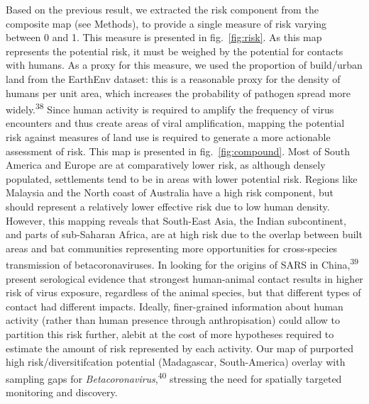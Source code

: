\documentclass[10pt,oneside]{article}
\begin{document}
Based on the previous result, we extracted the risk component from the
composite map (see Methods), to provide a single measure of risk varying
between 0 and 1. This measure is presented in fig.~\ref{fig:risk}. As
this map represents the potential risk, it must be weighed by the
potential for contacts with humans. As a proxy for this measure, we used
the proportion of build/urban land from the EarthEnv dataset: this is a
reasonable proxy for the density of humans per unit area, which
increases the probability of pathogen spread more
widely.\textsuperscript{38} Since human activity is required to amplify
the frequency of virus encounters and thus create areas of viral
amplification, mapping the potential risk against measures of land use
is required to generate a more actionable assessment of risk. This map
is presented in fig.~\ref{fig:compound}. Most of South America and
Europe are at comparatively lower risk, as although densely populated,
settlements tend to be in areas with lower potential risk. Regions like
Malaysia and the North coast of Australia have a high risk component,
but should represent a relatively lower effective risk due to low human
density. However, this mapping reveals that South-East Asia, the Indian
subcontinent, and parts of sub-Saharan Africa, are at high risk due to
the overlap between built areas and bat communities representing more
opportunities for cross-species transmission of betacoronaviruses. In
looking for the origins of SARS in China,\textsuperscript{39} present
serological evidence that strongest human-animal contact results in
higher risk of virus exposure, regardless of the animal species, but
that different types of contact had different impacts. Ideally,
finer-grained information about human activity (rather than human
presence through anthropisation) could allow to partition this risk
further, alebit at the cost of more hypotheses required to estimate the
amount of risk represented by each activity. Our map of purported high
risk/diversitifcation potential (Madagascar, South-America) overlay with
sampling gaps for \emph{Betacoronavirus},\textsuperscript{40} stressing
the need for spatially targeted monitoring and discovery.
\end{document}
